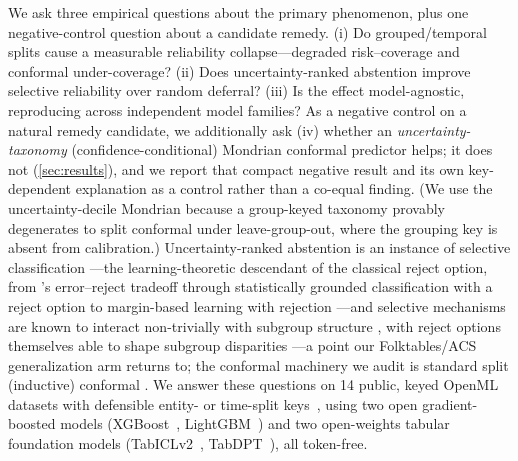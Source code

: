 \documentclass[pdflatex,sn-mathphys-num]{sn-jnl}
\begin{document}
We ask three empirical questions about the primary phenomenon, plus one negative-control question about
a candidate remedy. (i) Do grouped/temporal splits cause a measurable reliability
collapse---degraded risk--coverage and conformal under-coverage? (ii) Does uncertainty-ranked abstention
improve selective reliability over random deferral? (iii) Is the effect model-agnostic, reproducing across
independent model families? As a negative control on a natural remedy candidate, we additionally ask
(iv) whether an \emph{uncertainty-taxonomy} (confidence-conditional) Mondrian conformal predictor helps;
it does not (\cref{sec:results}), and we report that compact negative result and its own key-dependent
explanation as a control rather than a co-equal finding. (We use the uncertainty-decile Mondrian because a
group-keyed taxonomy provably degenerates to split conformal under leave-group-out, where the grouping key
is absent from calibration.)
Uncertainty-ranked abstention is an instance of selective classification
\citep{elyaniv2010selective,geifman2017selective}---the learning-theoretic descendant of the classical reject option, from
\citet{chow1970reject}'s error--reject tradeoff through statistically grounded classification with a
reject option \citep{herbei2006reject} to margin-based learning with rejection
\citep{cortes2016rejection}---and selective mechanisms are known to interact non-trivially with
subgroup structure \citep{jones2021selective}, with reject options themselves able to shape
subgroup disparities \citep{kamiran2018reject}---a point our Folktables/ACS generalization arm
returns to; the conformal machinery we audit is standard split (inductive) conformal
\citep{papadopoulos2002inductive,vovk2005algorithmic,angelopoulos2023conformal}.
We answer these questions on 14 public, keyed OpenML datasets with defensible entity- or time-split
keys~\citep{vanschoren2014openml},
using two open gradient-boosted models (XGBoost~\citep{chen2016xgboost}, LightGBM~\citep{ke2017lightgbm}) and two
open-weights tabular foundation models (TabICLv2~\citep{qu2026tabicl}, TabDPT~\citep{ma2024tabdpt}), all token-free.
\end{document}
